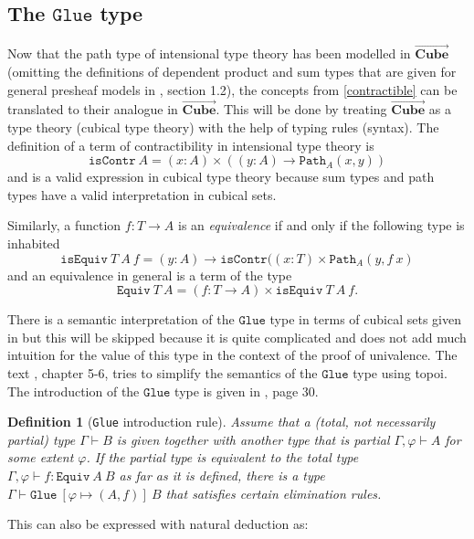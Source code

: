 \documentclass[12pt,a4paper,twoside,xetex]{book} %
\newcommand{\keyword}[1]{\emph{#1}\index{#1}}
\newtheorem{definition}[theorem]{Definition}
\newcommand{\psh}[1]{\overrightarrow{#1}}
\newcommand{\op}[1]{\mathtt{#1}}
\newcommand{\cube}[0]{\textbf{Cube}}
\newcommand{\pa}[3]{\op{Path}_{#1}\left(#2, #3\right)}
\newcommand{\isequiv}[3]{\op{isEquiv} \ #1 \ #2 \ #3}
\begin{document}
\subsection{The $\op{Glue}$ type}\label{glueOp}



Now that the path type of intensional type theory has been modelled in $\psh{\cube}$ (omitting the definitions of dependent product and sum types that are given for general presheaf models in \cite{Huber2016}, section 1.2), the concepts from \cref{contractible} can be translated to their analogue in $\psh{\cube}$. This will be done by treating $\psh{\cube}$ as a type theory (cubical type theory) with the help of typing rules (syntax). The 
definition of a term of contractibility in intensional type theory is 
$$\op{isContr} \ A = (x:A) \times \left( (y:A) \rightarrow \pa{A}{x}{y} 
\right)$$ and is a valid expression in cubical type theory because sum types 
and path types have a valid interpretation in cubical sets.

Similarly, a function $f:T \rightarrow A$ is an \keyword{equivalence} if and 
only if the following type is inhabited $$\isequiv{T}{A}{f} = (y: A) 
\rightarrow \op{isContr} ((x:T) \times \pa{A}{y}{f \ x}$$  and an equivalence 
in general is a term of the type $$\op{Equiv} \ T \ A = (f:T\rightarrow A) 
\times \isequiv{T}{A}{f}.$$ 
 

There is a semantic interpretation of the $\op{Glue}$ type in terms of cubical 
sets given in \cite{Huber2016} but this will be skipped because it is quite 
complicated and does not add much intuition for the value of this type in the 
context of the proof of univalence. The text \cite{Orton2019}, chapter 5-6, 
tries to simplify the semantics of the $\op{Glue}$ type using topoi. The 
introduction of the $\op{Glue}$ type is given in \cite{Orton2019}, page 30.

\begin{definition}[\texttt{Glue} introduction rule]
Assume that a (total, not 
necessarily partial) type $\Gamma \vdash B$ is given together with another type that is partial 
$\Gamma, \varphi \vdash A$ for some extent $\varphi$. If the partial type is 
equivalent to the total type $\Gamma, \varphi \vdash f : \op{Equiv} \ A \ B $ 
as far as it is defined, there is a type $\Gamma \vdash \op{Glue} \ \left[ 
\varphi \mapsto \left( A, f \right) \right] \ B$ that satisfies certain 
elimination rules. 
\end{definition}


 This can also be expressed with natural deduction as:
\end{document}
